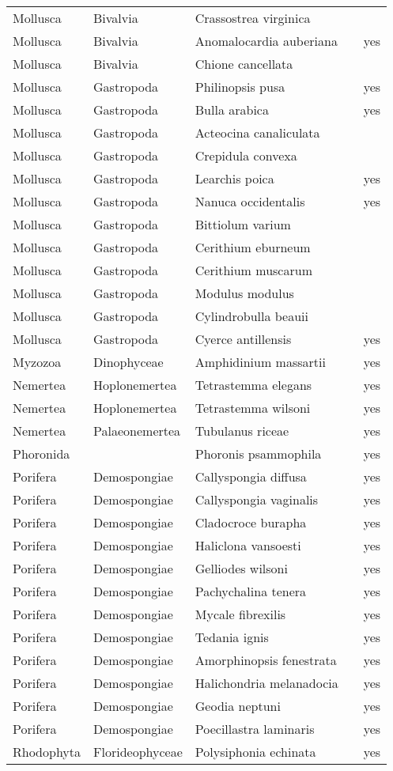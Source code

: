 \begin{longtable}{lllll}
  Mollusca & Bivalvia & Crassostrea virginica &  &  \\ 
  Mollusca & Bivalvia & Anomalocardia auberiana &  & yes \\ 
  Mollusca & Bivalvia & Chione cancellata &  &  \\ 
  Mollusca & Gastropoda & Philinopsis pusa &  & yes \\ 
  Mollusca & Gastropoda & Bulla arabica &  & yes \\ 
  Mollusca & Gastropoda & Acteocina canaliculata &  &  \\ 
  Mollusca & Gastropoda & Crepidula convexa &  &  \\ 
  Mollusca & Gastropoda & Learchis poica &  & yes \\ 
  Mollusca & Gastropoda & Nanuca occidentalis &  & yes \\ 
  Mollusca & Gastropoda & Bittiolum varium &  &  \\ 
  Mollusca & Gastropoda & Cerithium eburneum &  &  \\ 
  Mollusca & Gastropoda & Cerithium muscarum &  &  \\ 
  Mollusca & Gastropoda & Modulus modulus &  &  \\ 
  Mollusca & Gastropoda & Cylindrobulla beauii &  &  \\ 
  Mollusca & Gastropoda & Cyerce antillensis &  & yes \\ 
  Myzozoa & Dinophyceae & Amphidinium massartii &  & yes \\ 
  Nemertea & Hoplonemertea & Tetrastemma elegans &  & yes \\ 
  Nemertea & Hoplonemertea & Tetrastemma wilsoni &  & yes \\ 
  Nemertea & Palaeonemertea & Tubulanus riceae &  & yes \\ 
  Phoronida &  & Phoronis psammophila &  & yes \\ 
  Porifera & Demospongiae & Callyspongia diffusa &  & yes \\ 
  Porifera & Demospongiae & Callyspongia vaginalis &  & yes \\ 
  Porifera & Demospongiae & Cladocroce burapha &  & yes \\ 
  Porifera & Demospongiae & Haliclona vansoesti &  & yes \\ 
  Porifera & Demospongiae & Gelliodes wilsoni &  & yes \\ 
  Porifera & Demospongiae & Pachychalina tenera &  & yes \\ 
  Porifera & Demospongiae & Mycale fibrexilis &  & yes \\ 
  Porifera & Demospongiae & Tedania ignis &  & yes \\ 
  Porifera & Demospongiae & Amorphinopsis fenestrata &  & yes \\ 
  Porifera & Demospongiae & Halichondria melanadocia &  & yes \\ 
  Porifera & Demospongiae & Geodia neptuni &  & yes \\ 
  Porifera & Demospongiae & Poecillastra laminaris &  & yes \\ 
  Rhodophyta & Florideophyceae & Polysiphonia echinata &  & yes \\ 
   \hline
\hline
\end{longtable}
\endgroup
